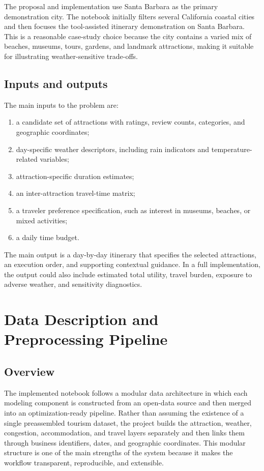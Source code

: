 \documentclass[12pt,a4paper]{article}
\begin{document}
The proposal and implementation use Santa Barbara as the primary demonstration city. The notebook initially filters several California coastal cities and then focuses the tool-assisted itinerary demonstration on Santa Barbara. This is a reasonable case-study choice because the city contains a varied mix of beaches, museums, tours, gardens, and landmark attractions, making it suitable for illustrating weather-sensitive trade-offs.

\subsection{Inputs and outputs}

The main inputs to the problem are:
\begin{enumerate}[leftmargin=2em]
    \item a candidate set of attractions with ratings, review counts, categories, and geographic coordinates;
    \item day-specific weather descriptors, including rain indicators and temperature-related variables;
    \item attraction-specific duration estimates;
    \item an inter-attraction travel-time matrix;
    \item a traveler preference specification, such as interest in museums, beaches, or mixed activities;
    \item a daily time budget.
\end{enumerate}

The main output is a day-by-day itinerary that specifies the selected attractions, an execution order, and supporting contextual guidance. In a full implementation, the output could also include estimated total utility, travel burden, exposure to adverse weather, and sensitivity diagnostics.

\section{Data Description and Preprocessing Pipeline}

\subsection{Overview}

The implemented notebook follows a modular data architecture in which each modeling component is constructed from an open-data source and then merged into an optimization-ready pipeline. Rather than assuming the existence of a single preassembled tourism dataset, the project builds the attraction, weather, congestion, accommodation, and travel layers separately and then links them through business identifiers, dates, and geographic coordinates. This modular structure is one of the main strengths of the system because it makes the workflow transparent, reproducible, and extensible.
\end{document}

